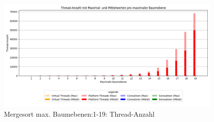 \documentclass[fontsize=12pt,paper=a4,twoside=semi,parskip=half-,headsepline,headinclude]{scrreprt}
\begin{document}
\begin{figure}[H]
	\centering
	\includegraphics[scale=0.5]{figures/mergesort/Maximalebauebenen1-19_pvcg/num_threads_bar_plot.png}
	\caption{Mergesort max. Baumebenen:1-19: Thread-Anzahl}
	\label{fig:ms1-19Threads}
\end{figure}
\end{document}
